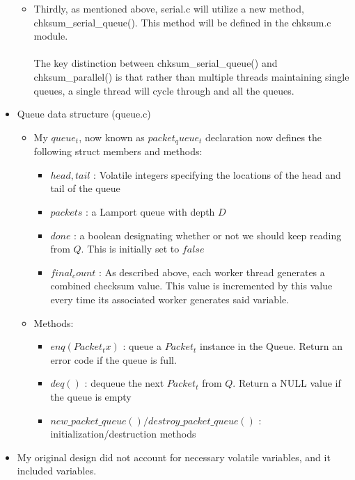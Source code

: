 \documentclass[]{article}
\begin{document}
\begin{itemize}
\begin{itemize}
		\item Thirdly, as mentioned above, serial.c will utilize a new method, chksum\_serial\_queue(). This method will be defined in the chksum.c module.
		\\\\
		The key distinction between chksum\_serial\_queue() and chksum\_parallel() is that rather than multiple threads maintaining single queues, a single thread will cycle through and all the queues.
	\end{itemize}
	\item Queue data structure (queue.c)
	\begin{itemize}
		\item My $queue_t$, now known as $packet_queue_t$ declaration now defines the following struct members and methods:
		\begin{itemize}
			\item $head, tail$ : Volatile integers specifying the locations of the head and tail of the queue
			\item $packets$ : a Lamport queue with depth $D$
			\item $done$ : a boolean designating whether or not we should keep
			reading from $Q$. This is initially set to $false$
			\item $final_count$ : As described above, each worker thread generates a combined checksum value. This value is incremented by this value every time its associated worker generates said variable.
		\end{itemize}
		\item Methods:
		\begin{itemize}
			\item $enq(Packet_t x)$ : queue a $Packet_t$ instance in the Queue. Return an error code if the queue is full.
			\item $deq()$ : dequeue the next $Packet_t$ from $Q$. Return a NULL value if the queue is empty
			\item $new\_packet\_queue()/destroy\_packet\_queue()$ : initialization/destruction methods
		\end{itemize}
	\end{itemize}
		\item My original design did not account for necessary volatile variables, and it included variables.
		
\end{itemize}
\end{document}
